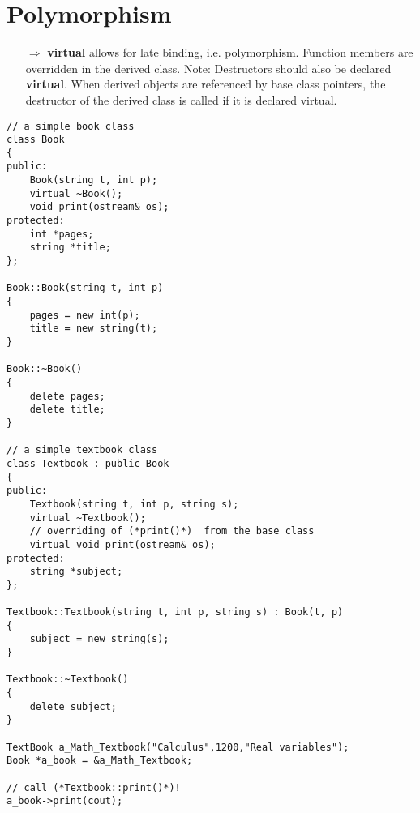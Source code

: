 \documentclass[10pt]{article}
\begin{document}
\section{Polymorphism}
\small
\begin{enumerate}
\item[$\Rightarrow$] \textbf{virtual} allows for late binding, i.e.
polymorphism. Function members are
overridden in the derived class. Note: Destructors should also be
 declared \textbf{virtual}. When derived
objects are referenced by base class
pointers, the destructor of the derived class
is called if it is declared virtual.
\end{enumerate}
\begin{lstlisting}
// a simple book class
class Book
{
public:
    Book(string t, int p);
    virtual ~Book();
    void print(ostream& os);
protected:
    int *pages;
    string *title;
};

Book::Book(string t, int p)
{
    pages = new int(p);
    title = new string(t);
}

Book::~Book()
{
    delete pages;
    delete title;
}

// a simple textbook class
class Textbook : public Book
{
public:
    Textbook(string t, int p, string s);
    virtual ~Textbook();
    // overriding of (*print()*)  from the base class
    virtual void print(ostream& os);
protected:
    string *subject;
};

Textbook::Textbook(string t, int p, string s) : Book(t, p)
{
    subject = new string(s);
}

Textbook::~Textbook()
{
    delete subject;
}

TextBook a_Math_Textbook("Calculus",1200,"Real variables");
Book *a_book = &a_Math_Textbook;

// call (*Textbook::print()*)!
a_book->print(cout);
\end{lstlisting}
%
%
\end{document}

